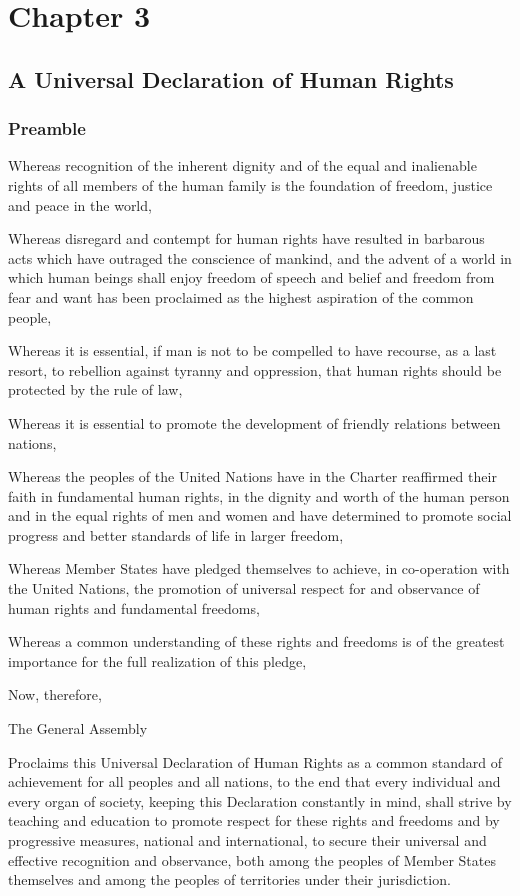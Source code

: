 \documentclass[
  ngerman,
  american,
  titlepage,
  openright,
  DIV=calc,
  toc=listof,
  listof=nochaptergap]{scrbook}
\begin{document}
\chapter{Chapter 3}\label{sec-chapter3}

\section{A Universal Declaration of Human
Rights}\label{a-universal-declaration-of-human-rights-2}

\subsection{Preamble}\label{preamble-2}

Whereas recognition of the inherent dignity and of the equal and
inalienable rights of all members of the human family is the foundation
of freedom, justice and peace in the world,

Whereas disregard and contempt for human rights have resulted in
barbarous acts which have outraged the conscience of mankind, and the
advent of a world in which human beings shall enjoy freedom of speech
and belief and freedom from fear and want has been proclaimed as the
highest aspiration of the common people,

Whereas it is essential, if man is not to be compelled to have recourse,
as a last resort, to rebellion against tyranny and oppression, that
human rights should be protected by the rule of law,

Whereas it is essential to promote the development of friendly relations
between nations,

Whereas the peoples of the United Nations have in the Charter reaffirmed
their faith in fundamental human rights, in the dignity and worth of the
human person and in the equal rights of men and women and have
determined to promote social progress and better standards of life in
larger freedom,

Whereas Member States have pledged themselves to achieve, in
co-operation with the United Nations, the promotion of universal respect
for and observance of human rights and fundamental freedoms,

Whereas a common understanding of these rights and freedoms is of the
greatest importance for the full realization of this pledge,

Now, therefore,

The General Assembly

Proclaims this Universal Declaration of Human Rights as a common
standard of achievement for all peoples and all nations, to the end that
every individual and every organ of society, keeping this Declaration
constantly in mind, shall strive by teaching and education to promote
respect for these rights and freedoms and by progressive measures,
national and international, to secure their universal and effective
recognition and observance, both among the peoples of Member States
themselves and among the peoples of territories under their
jurisdiction.
\end{document}
